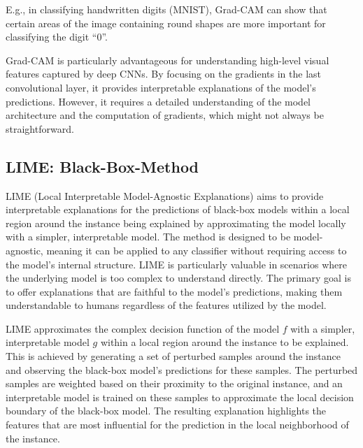 \documentclass{article}
\begin{document}
E.g., in classifying handwritten digits (MNIST), Grad-CAM can show that certain areas of the image containing round shapes are more important for classifying the digit “0”.

Grad-CAM is particularly advantageous for understanding high-level visual features captured by deep CNNs. By focusing on the gradients in the last convolutional layer, it provides interpretable explanations of the model’s predictions. However, it requires a detailed understanding of the model architecture and the computation of gradients, which might not always be straightforward.


\subsection{LIME: Black-Box-Method}

LIME (Local Interpretable Model-Agnostic Explanations) aims to provide interpretable explanations for the predictions of black-box models within a local region around the instance being explained by approximating the model locally with a simpler, interpretable model. The method is designed to be model-agnostic, meaning it can be applied to any classifier without requiring access to the model’s internal structure. LIME is particularly valuable in scenarios where the underlying model is too complex to understand directly. The primary goal is to offer explanations that are faithful to the model’s predictions, making them understandable to humans regardless of the features utilized by the model.

LIME approximates the complex decision function of the model $f$ with a simpler, interpretable model $g$ within a local region around the instance to be explained. This is achieved by generating a set of perturbed samples around the instance and observing the black-box model’s predictions for these samples. The perturbed samples are weighted based on their proximity to the original instance, and an interpretable model is trained on these samples to approximate the local decision boundary of the black-box model. The resulting explanation highlights the features that are most influential for the prediction in the local neighborhood of the instance.
\end{document}
